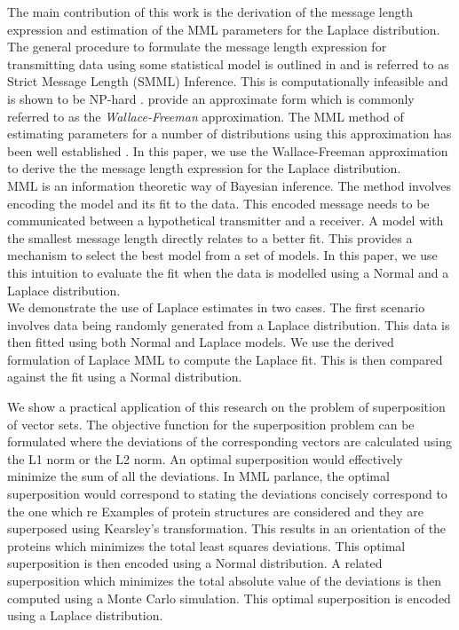 \documentclass[wcp]{jmlr}
\begin{document}
The main contribution of this work is the derivation of the message length 
expression and estimation of the MML parameters for the Laplace distribution.
The general procedure to formulate the message length expression for transmitting
data using some statistical model is outlined in \citet{wallace-87} and is 
referred to as Strict Message Length (SMML) Inference. This is computationally
infeasible and is shown to be NP-hard \citep{Farr01012002}. \citet{wallace-87}
provide an approximate form which is commonly referred to as the 
\emph{Wallace-Freeman} approximation. The MML method
of estimating parameters for a number of distributions using this approximation
has been well established \citep{WallaceBook}. In this paper, we use the 
Wallace-Freeman approximation
to derive the the message length expression for the Laplace distribution. \\

MML is an information theoretic way of Bayesian inference. The method involves
encoding the model and its fit to the data. This encoded message needs to be communicated
between a hypothetical transmitter and a receiver. A model with the smallest message
length directly relates to a better fit. This provides a mechanism to select the
best model from a set of models. In this paper, we use this intuition to 
evaluate the fit when the data is modelled  using a Normal and a Laplace distribution. \\

We demonstrate the use of Laplace estimates in two cases. 
The first scenario involves data being randomly
generated from a Laplace distribution. This data is then fitted using
both Normal and Laplace models. We use the derived formulation of Laplace MML to
compute the Laplace fit. This is then compared against the fit using a Normal
distribution.

We show a practical application of this research on the problem of superposition of 
vector sets. The objective function for the superposition problem can be formulated
where the deviations of the corresponding vectors are calculated using the L1 norm 
or the L2 norm. An optimal superposition would effectively minimize the sum of all
the deviations. In MML parlance, the optimal superposition would correspond to stating
the deviations concisely
correspond to the one which re
Examples of protein structures are considered
and they are superposed using Kearsley's transformation. This results in an
orientation of the proteins which minimizes the total least squares deviations. 
This optimal superposition is then encoded using a Normal distribution.
A related superposition which minimizes the total absolute 
value of the deviations is then computed using a Monte Carlo 
simulation. This optimal superposition is encoded using a Laplace distribution.
\end{document}
